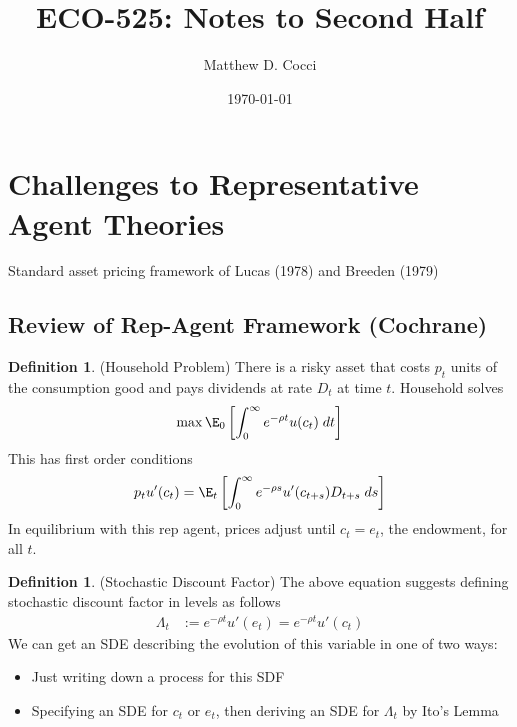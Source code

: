 \documentclass[12pt]{article}
\author{Matthew D. Cocci}
\title{ECO-525: Notes to Second Half}
\date{\today}
\theoremstyle{plain}
\theoremstyle{definition}
\newtheorem{defn}[thm]{Definition}
\theoremstyle{remark}
\begin{document}
\maketitle

\section{Challenges to Representative Agent Theories}

Standard asset pricing framework of Lucas (1978) and Breeden (1979)

\subsection{Review of Rep-Agent Framework (Cochrane)}

\begin{defn}(Household Problem)
There is a risky asset that costs $p_t$ units of the consumption good
and pays dividends at rate $D_t$ at time $t$.
Household solves
\begin{align*}
  \max \E_0\left[\int_0^\infty e^{-\rho t}u(c_t)\;dt\right]
\end{align*}
This has first order conditions
\begin{align}
  p_t u'(c_t) =
  \E_t\left[\int^\infty_0 e^{-\rho s}u'(c_{t+s})D_{t+s}\;ds\right]
  \label{pemx}
\end{align}
In equilibrium with this rep agent, prices adjust until $c_t=e_t$, the
endowment, for all $t$.
\end{defn}

\begin{defn}(Stochastic Discount Factor)
The above equation suggests defining stochastic discount factor in
levels as follows
\begin{align}
  \Lambda_t
  &:= e^{-\rho t} u'(e_t)
  = e^{-\rho t} u'(c_t)
  \label{sdf}
\end{align}
We can get an SDE describing the evolution of this variable in one of
two ways:
\begin{itemize}
  \item Just writing down a process for this SDF
  \item Specifying an SDE for $c_t$ or $e_t$, then deriving an SDE for
    $\Lambda_t$ by Ito's Lemma
\end{itemize}
\end{defn}
\end{document}

